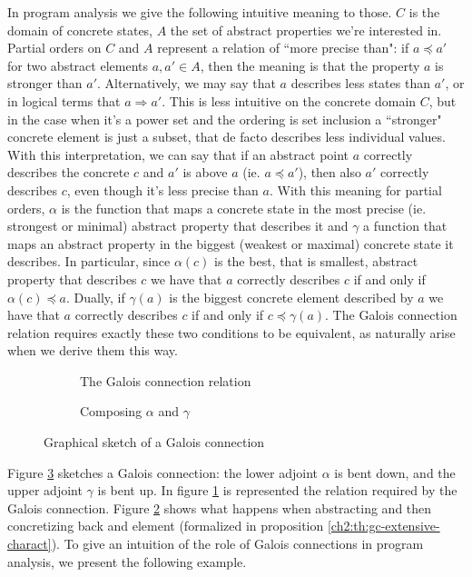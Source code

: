 In program analysis we give the following intuitive meaning to those. $C$ is the domain of concrete states, $A$ the set of abstract properties we're interested in. Partial orders on $C$ and $A$ represent a relation of ``more precise than": if $a \preceq a'$ for two abstract elements $a, a' \in A$, then the meaning is that the property $a$ is stronger than $a'$. Alternatively, we may say that $a$ describes less states than $a'$, or in logical terms that $a \Rightarrow a'$. This is less intuitive on the concrete domain $C$, but in the case when it's a power set and the ordering is set inclusion a ``stronger" concrete element is just a subset, that de facto describes less individual values. With this interpretation, we can say that if an abstract point $a$ correctly describes the concrete $c$ and $a'$ is above $a$ (ie. $a \preceq a'$), then also $a'$ correctly describes $c$, even though it's less precise than $a$.
With this meaning for partial orders, $\alpha$ is the function that maps a concrete state in the most precise (ie. strongest or minimal) abstract property that describes it and $\gamma$ a function that maps an abstract property in the biggest (weakest or maximal) concrete state it describes. In particular, since $\alpha(c)$ is the best, that is smallest, abstract property that describes $c$ we have that $a$ correctly describes $c$ if and only if $\alpha(c) \preceq a$. Dually, if $\gamma(a)$ is the biggest concrete element described by $a$ we have that $a$ correctly describes $c$ if and only if $c \preceq \gamma(a)$. The Galois connection relation requires exactly these two conditions to be equivalent, as naturally arise when we derive them this way.

\begin{figure}[ht]
	\centering
	\begin{subfigure}{.5\textwidth}
		\centering
		{
			\selectfont
			\def\svgwidth{.8\textwidth}
			
		}
		\caption{The Galois connection relation}
		\label{ch2:fig:gc-sketch:relation}
	\end{subfigure}%
	\begin{subfigure}{.5\textwidth}
		\centering
		{
			\selectfont
			\def\svgwidth{.8\textwidth}
			
		}
		\caption{Composing $\alpha$ and $\gamma$}
		\label{ch2:fig:gc-sketch:gamma-alpha-c}
	\end{subfigure}
	\caption{Graphical sketch of a Galois connection}
	\label{ch2:fig:gc-sketch}
\end{figure}
Figure \ref{ch2:fig:gc-sketch} sketches a Galois connection: the lower adjoint $\alpha$ is bent down, and the upper adjoint $\gamma$ is bent up.
In figure \ref{ch2:fig:gc-sketch:relation} is represented the relation required by the Galois connection. Figure \ref{ch2:fig:gc-sketch:gamma-alpha-c} shows what happens when abstracting and then concretizing back and element (formalized in proposition \ref{ch2:th:gc-extensive-charact}).
To give an intuition of the role of Galois connections in program analysis, we present the following example.

